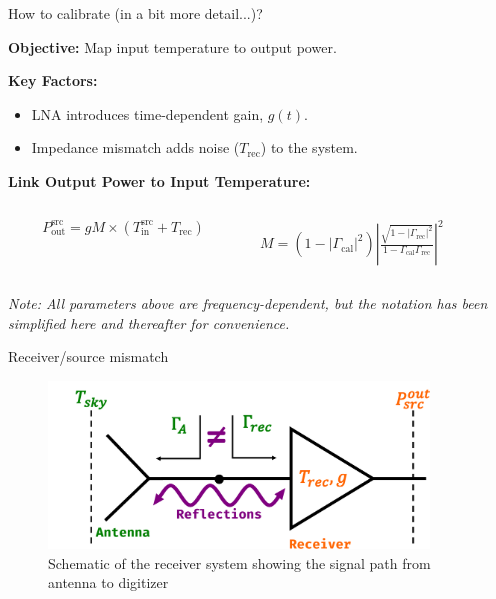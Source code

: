 \documentclass[aspectratio=169]{beamer}
\begin{document}
\begin{frame}{\small{How to calibrate (in a bit more detail...)?}}
	\vspace{-0.5cm}
	\begin{flushleft}
		\textbf{Objective:} Map input temperature to output power.
		\vspace{0.2cm}

		\textbf{Key Factors:}
		\begin{itemize}
			\item LNA introduces time-dependent gain, $g(t)$.
			\item Impedance mismatch adds noise ($T_{\text{rec}}$) to the system.
		\end{itemize}

		\vspace{0.2cm}
		\textbf{Link Output Power to Input Temperature:}
	\end{flushleft}

	\begin{columns}
		\begin{column}{0.5\textwidth}
			{
				\begin{equation}
					P_{\text{out}}^{\text{src}} = g M \times \left( T_{\text{in}}^{\text{src}} + T_{\text{rec}} \right)
				\end{equation}
			}

		\end{column}
		\begin{column}{0.3\textwidth}

			\small $M = \left( 1 - |\Gamma_{\text{cal}}|^2 \right) | \frac{\sqrt{1 - |\Gamma_{\text{rec}}|^2}}{1 - \Gamma_{\text{cal}} \Gamma_{\text{rec}}}|^2$
		\end{column}
	\end{columns}

	\vfill

	\begin{footnotesize}
		\textit{Note: All parameters above are frequency-dependent, but the notation has been simplified here and thereafter for convenience.}
	\end{footnotesize}

\end{frame}


\begin{frame}{\small{Receiver/source mismatch}}
	\begin{figure}[h]
		\centering
		\includegraphics[width=0.9\textwidth]{images/intro_receiver.pdf}
		\caption{Schematic of the receiver system showing the signal path from antenna to digitizer}
	\end{figure}
\end{frame}
\end{document}
